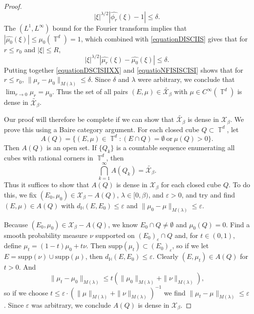 \documentclass[dvipsnames,letterpaper,12pt]{article}
\numberwithin{equation}{section}
\DeclareMathOperator{\TT}{\mathbb{T}}
\numberwithin{theorem}{section}
\begin{document}
\begin{proof}
    \begin{equation} \label{equationDISCIIS}
        |\xi|^{\lambda/2} |\widehat{\phi_r}(\xi) - 1| \leq \delta.
    \end{equation}
    The $(L^1,L^\infty)$ bound for the Fourier transform implies that $|\widehat{\mu_0}(\xi)| \leq \mu_0(\TT^d) = 1$, which combined with \eqref{equationDISCIIS} gives that for $r \leq r_0$ and $|\xi| \leq R$,
    \begin{equation} \label{equatioNFISISCISI}
        |\xi|^{\lambda/2} |\widehat{\mu_r}(\xi) - \widehat{\mu_0}(\xi)| \leq \delta.
    \end{equation}
    Putting together \eqref{equationDSCISIIXX} and \eqref{equatioNFISISCISI} shows that for $r \leq r_0$, $\| \mu_r - \mu_0 \|_{M(\lambda)} \leq \delta$. Since $\delta$ and $\lambda$ were arbitrary, we conclude that $\lim_{r \to 0} \mu_r = \mu_0$. Thus the set of all pairs $(E,\mu) \in \tilde{\mathcal{X}_\beta}$ with $\mu \in C^\infty(\TT^d)$ is dense in $\tilde{\mathcal{X}_\beta}$.

    Our proof will therefore be complete if we can show that $\tilde{\mathcal{X}_\beta}$ is dense in $\mathcal{X}_\beta$. We prove this using a Baire category argument. For each closed cube $Q \subset \TT^d$, let
    \[ A(Q) = \{ (E,\mu) \in \TT^d: (E \cap Q) = \emptyset\ \text{or}\ \mu(Q) > 0 \}. \]
    Then $A(Q)$ is an open set. If $\{ Q_k \}$ is a countable sequence enumerating all cubes with rational corners in $\TT^d$, then
    \begin{equation}
        \bigcap_{k = 1}^\infty A(Q_k) = \tilde{\mathcal{X}_\beta}.
    \end{equation}
    Thus it suffices to show that $A(Q)$ is dense in $\mathcal{X}_\beta$ for each closed cube $Q$. To do this, we fix $(E_0,\mu_0) \in \mathcal{X}_\beta - A(Q)$, $\lambda \in [0,\beta)$, and $\varepsilon > 0$, and try and find $(E,\mu) \in A(Q)$ with $d_\mathbb{H}(E,E_0) \leq \varepsilon$ and $\| \mu_0 - \mu \|_{M(\lambda)} \leq \varepsilon$.

    Because $(E_0,\mu_0) \in \mathcal{X}_\beta - A(Q)$, we know $E_0 \cap Q \neq \emptyset$ and $\mu_0(Q) = 0$. Find a smooth probability measure $\nu$ supported on $(E_0)_\varepsilon \cap Q$ and, for $t \in (0,1)$, define $\mu_t = (1 - t) \mu_0 + t \nu$. Then $\text{supp}(\mu_t) \subset (E_0)_\varepsilon$, so if we let $E = \text{supp}(\nu) \cup \text{supp}(\mu)$, then $d_\mathbb{H}(E,E_0) \leq \varepsilon$. Clearly $(E,\mu_t) \in A(Q)$ for $t > 0$. And
    \begin{equation}
        \| \mu_t - \mu_0 \|_{M(\lambda)} \leq t \left( \| \mu_0 \|_{M(\lambda)} + \| \nu \|_{M(\lambda)} \right),
    \end{equation}
    so if we choose $t \leq \varepsilon \cdot (\| \mu \|_{M(\lambda)} + \| \nu \|_{M(\lambda)})^{-1}$ we find $\| \mu_t - \mu \|_{M(\lambda)} \leq \varepsilon$. Since $\varepsilon$ was arbitrary, we conclude $A(Q)$ is dense in $\mathcal{X}_\beta$.
\end{proof}
\end{document}
